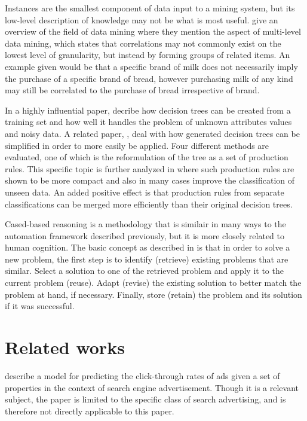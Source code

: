 \documentclass[11pt,a4paper]{report}
\begin{document}
Instances are the smallest component of data input to a mining system, but its low-level description of knowledge may not be what is most useful. \citet{Chen1996} give an overview of the field of data mining where they mention the aspect of multi-level data mining, which states that correlations may not commonly exist on the lowest level of granularity, but instead by forming groups of related items. An example given would be that a specific brand of milk does not necessarily imply the purchase of a specific brand of bread, however purchasing milk of any kind may still be correlated to the purchase of bread irrespective of brand.


In a highly influential paper, \citet{Quinlan1986} decribe how decision trees can be created from a training set and how well it handles the problem of unknown attributes values and noisy data. A related paper, \citet{Quinlan1987}, deal with how generated decision trees can be simplified in order to more easily be applied. Four different methods are evaluated, one of which is the reformulation of the tree as a set of production rules. This specific topic is further analyzed in \citet{Quinlan1987b} where such production rules are shown to be more compact and also in many cases improve the classification of unseen data. An added positive effect is that production rules from separate classifications can be merged more efficiently than their original decision trees.

Cased-based reasoning is a methodology that is similair in many ways to the automation framework described previously, but it is more closely related to human cognition. The basic concept as described in \citet{Watson1999} is that in order to solve a new problem, the first step is to identify (retrieve) existing problems that are similar. Select a solution to one of the retrieved problem and apply it to the current problem (reuse). Adapt (revise) the existing solution to better match the problem at hand, if necessary. Finally, store (retain) the problem and its solution if it was successful.

\chapter{Related works}
\citet{Richardson2007} describe a model for predicting the click-through rates of ads given a set of properties in the context of search engine advertisement. Though it is a relevant subject, the paper is limited to the specific class of search advertising, and is therefore not directly applicable to this paper.
\end{document}
